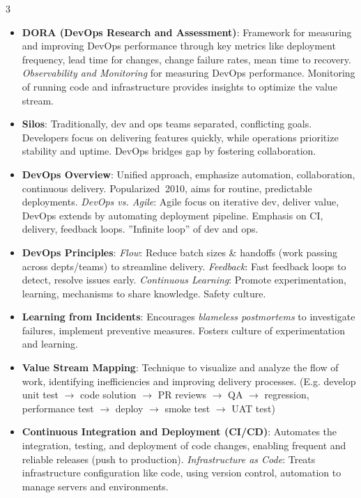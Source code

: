 \documentclass[a4paper, 10pt, landscape]{article}
\begin{document}
\begin{multicols*}{3}
\begin{itemize}
    \item \textbf{DORA (DevOps Research and Assessment)}: Framework for measuring and improving DevOps performance through key metrics like deployment frequency, lead time for changes, change failure rates, mean time to recovery. \textit{Observability and Monitoring} for measuring DevOps performance. Monitoring of running code and infrastructure provides insights to optimize the value stream.
    \item \textbf{Silos}: Traditionally, dev and ops teams separated, conflicting goals. Developers focus on delivering features quickly, while operations prioritize stability and uptime. DevOps bridges gap by fostering collaboration.
    \item \textbf{DevOps Overview}: Unified approach, emphasize automation, collaboration, continuous delivery. Popularized $~$2010, aims for routine, predictable deployments. \textit{DevOps vs. Agile}: Agile focus on iterative dev, deliver value, DevOps extends by automating deployment pipeline. Emphasis on CI, delivery, feedback loops. ''Infinite loop'' of dev and ops.
    \item \textbf{DevOps Principles}: \textit{Flow}: Reduce batch sizes \& handoffs (work passing across depts/teams) to streamline delivery. \textit{Feedback}: Fast feedback loops to detect, resolve issues early. \textit{Continuous Learning}: Promote experimentation, learning, mechanisms to share knowledge. Safety culture.
        \item \textbf{Learning from Incidents}: Encourages \textit{blameless postmortems} to investigate failures, implement preventive measures. Fosters culture of experimentation and learning.
       \item \textbf{Value Stream Mapping}: Technique to visualize and analyze the flow of work, identifying inefficiencies and improving delivery processes. (E.g. develop unit test $\rightarrow$ code solution $\rightarrow$ PR reviews $\rightarrow$ QA $\rightarrow$ regression, performance test $\rightarrow$ deploy $\rightarrow$ smoke test $\rightarrow$ UAT test)
    \item \textbf{Continuous Integration and Deployment (CI/CD)}: Automates the integration, testing, and deployment of code changes, enabling frequent and reliable releases (push to production). \textit{Infrastructure as Code}: Treats infrastructure configuration like code, using version control, automation to manage servers and environments.
\end{itemize}


\end{multicols*}
\end{document}
